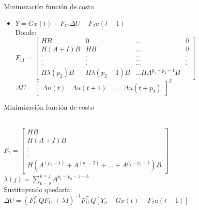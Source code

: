 \documentclass{beamer}
\begin{document}
\begin{frame}{Minimización función de costo}
\begin{justify}
\vspace{0.3cm}
\begin{itemize}
Este criterio de rendimiento se utiliza en muchos controladores predictivos. Para hacer frente a los incrementos de control en lugar de la salida de control, la ecuación compuesta se puede reescribir como:
\\
\item $Y=Gx(t)+F_{11}\Delta U + F_2 u(t-1)$
\\
Donde:
\\
\centering
$F_{11}=
\begin{bmatrix}
    HB & 0 & ... & 0 \\
    H(A+I)B & HB & ... & 0\\
    . & . & ... & . \\
    . & . & ... & . \\
    . & . & ... & . \\
    H\lambda(p_2)B & H\lambda(p_2-1)B & ... HA^{p_1-p_2-1}B
\end{bmatrix}$
\\
$\Delta U =
\begin{bmatrix}
    \Delta u(t) & \Delta u(t+1) & ... & \Delta u(t+p_2)
\end{bmatrix}^T$
\end{itemize}
\end{justify}
\end{frame}


\begin{frame}{Minimización función de costo}
\begin{justify}
\vspace{0.3cm}
\begin{itemize}
\\
\centering
$F_{2}=
\begin{bmatrix}
    HB \\
    H(A+I)B\\
    . \\
    . \\
    . \\
    H(A^(p_1-1)+ A^(p_1-2)+... +A^{p_1-p_2-1})B
\end{bmatrix}$
\\
\hfill \break
$\lambda (j) =\sum_{k=o}^{k=j} A^{p_1-p_2-1+k}$
\\
\hfill \break
Sustituyendo quedaría:
\hfill \break
\centering
$ \Delta U = (F_{11}^T Q F_{11}+\lambda I)^{-1}F_{11}^T Q  \left [ Y_d-Gx(t)-F_2 u (t-1)  \right ] $
\end{itemize}
\end{justify}
\end{frame}
\end{document}
